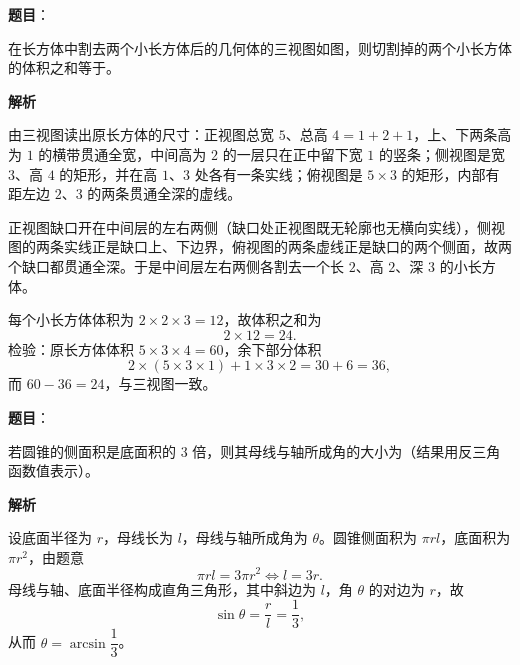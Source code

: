 \begin{answer}

\textbf{题目}：

在长方体中割去两个小长方体后的几何体的三视图如图，则切割掉的两个小长方体的体积之和等于\gkblank{}。
\nopagebreak[4]
\begin{center}\end{center}
\nopagebreak[4]
\textbf{解析}

由三视图读出原长方体的尺寸：正视图总宽 $5$、总高 $4=1+2+1$，上、下两条高为 $1$ 的横带贯通全宽，中间高为 $2$ 的一层只在正中留下宽 $1$ 的竖条；侧视图是宽 $3$、高 $4$ 的矩形，并在高 $1$、$3$ 处各有一条实线；俯视图是 $5\times3$ 的矩形，内部有距左边 $2$、$3$ 的两条贯通全深的虚线。

正视图缺口开在中间层的左右两侧（缺口处正视图既无轮廓也无横向实线），侧视图的两条实线正是缺口上、下边界，俯视图的两条虚线正是缺口的两个侧面，故两个缺口都贯通全深。于是中间层左右两侧各割去一个长 $2$、高 $2$、深 $3$ 的小长方体。

每个小长方体体积为 $2\times2\times3=12$，故体积之和为
\nopagebreak[4]
\[2\times12=24 .\]
检验：原长方体体积 $5\times3\times4=60$，余下部分体积
\nopagebreak[4]
\[2\times(5\times3\times1)+1\times3\times2=30+6=36,\]
而 $60-36=24$，与三视图一致。


\end{answer}
\begin{answer}

\textbf{题目}：

若圆锥的侧面积是底面积的 $3$ 倍，则其母线与轴所成角的大小为\gkblank{}（结果用反三角函数值表示）。

\textbf{解析}

设底面半径为 $r$，母线长为 $l$，母线与轴所成角为 $\theta$。圆锥侧面积为 $\pi rl$，底面积为 $\pi r^2$，由题意
\nopagebreak[4]
\[\pi rl=3\pi r^2\iff l=3r .\]
母线与轴、底面半径构成直角三角形，其中斜边为 $l$，角 $\theta$ 的对边为 $r$，故
\nopagebreak[4]
\[\sin\theta=\frac rl=\frac13,\]
从而 $\theta=\arcsin\dfrac13$。


\end{answer}
